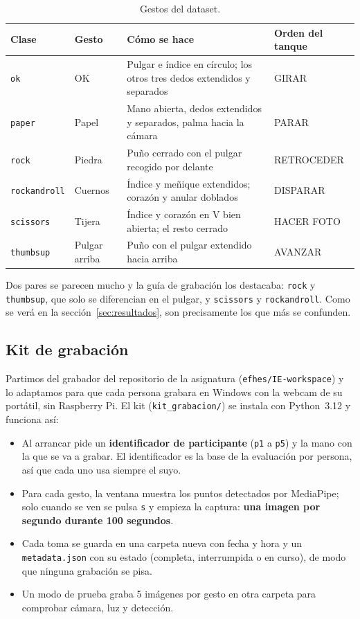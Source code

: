 \documentclass[11pt,a4paper]{article}
\newcommand{\codigo}[1]{\texttt{#1}}
\begin{document}
\begin{table}[H]
\centering\small
\begin{tabularx}{\linewidth}{llX l}
\toprule
Clase & Gesto & Cómo se hace & Orden del tanque \\
\midrule
\codigo{ok} & OK & Pulgar e índice en círculo; los otros tres dedos extendidos y separados & GIRAR \\
\codigo{paper} & Papel & Mano abierta, dedos extendidos y separados, palma hacia la cámara & PARAR \\
\codigo{rock} & Piedra & Puño cerrado con el pulgar recogido por delante & RETROCEDER \\
\codigo{rockandroll} & Cuernos & Índice y meñique extendidos; corazón y anular doblados & DISPARAR \\
\codigo{scissors} & Tijera & Índice y corazón en V bien abierta; el resto cerrado & HACER FOTO \\
\codigo{thumbsup} & Pulgar arriba & Puño con el pulgar extendido hacia arriba & AVANZAR \\
\bottomrule
\end{tabularx}
\caption{Gestos del dataset.}
\end{table}

Dos pares se parecen mucho y la guía de grabación los destacaba: \codigo{rock} y \codigo{thumbsup}, que solo se
diferencian en el pulgar, y \codigo{scissors} y \codigo{rockandroll}. Como se verá en la sección~\ref{sec:resultados},
son precisamente los que más se confunden.

\subsection{Kit de grabación}

Partimos del grabador del repositorio de la asignatura (\codigo{efhes/IE-workspace}) y lo adaptamos para que cada
persona grabara en Windows con la webcam de su portátil, sin Raspberry Pi. El kit (\codigo{kit\_grabacion/}) se instala
con Python~3.12 y funciona así:

\begin{itemize}
  \item Al arrancar pide un \textbf{identificador de participante} (\codigo{p1} a \codigo{p5}) y la mano con la que se
        va a grabar. El identificador es la base de la evaluación por persona, así que cada uno usa siempre el suyo.
  \item Para cada gesto, la ventana muestra los puntos detectados por MediaPipe; solo cuando se ven se pulsa
        \codigo{s} y empieza la captura: \textbf{una imagen por segundo durante 100 segundos}.
  \item Cada toma se guarda en una carpeta nueva con fecha y hora y un \codigo{metadata.json} con su estado
        (completa, interrumpida o en curso), de modo que ninguna grabación se pisa.
  \item Un modo de prueba graba 5 imágenes por gesto en otra carpeta para comprobar cámara, luz y detección.
\end{itemize}
\end{document}
